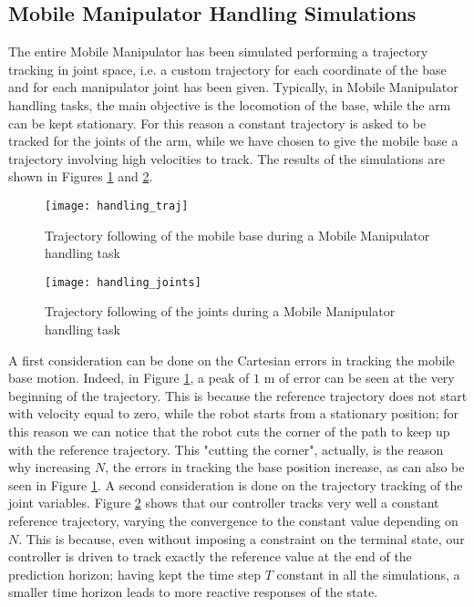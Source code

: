 \subsection{Mobile Manipulator Handling Simulations}
The entire Mobile Manipulator has been simulated performing a trajectory tracking in joint space, i.e. a custom trajectory for each coordinate of the base and for each manipulator joint has been given. Typically, in Mobile Manipulator handling tasks, the main objective is the locomotion of the base, while the arm can be kept stationary. For this reason a constant trajectory is asked to be tracked for the joints of the arm, while we have chosen to give the mobile base a trajectory involving high velocities to track. The results of the simulations are shown in Figures \ref{handling_traj} and \ref{handling_joints}. 
\begin{figure}[p]
	\centering
	\texttt{[image: handling\_traj]}
	\caption{Trajectory following of the mobile base during a Mobile Manipulator handling task}
	\label{handling_traj}
\end{figure}
\begin{figure}[p]
	\centering
	\texttt{[image: handling\_joints]}
	\caption{Trajectory following of the joints during a Mobile Manipulator handling task}
	\label{handling_joints}
\end{figure}A first consideration can be done on the Cartesian errors in tracking the mobile base motion. Indeed, in Figure \ref{handling_traj}, a peak of $1$ m of error can be seen at the very beginning of the trajectory. This is because the reference trajectory does not start with velocity equal to zero, while the robot starts from a stationary position; for this reason we can notice that the robot cuts the corner of the path to keep up with the reference trajectory. This "cutting the corner", actually, is the reason why increasing $N$, the errors in tracking the base position increase, as can also be seen in Figure \ref{handling_traj}. A second consideration is done on the trajectory tracking of the joint variables. Figure \ref{handling_joints} shows that our controller tracks very well a constant reference trajectory, varying the convergence to the constant value depending on $N$. This is because, even without imposing a constraint on the terminal state, our controller is driven to track exactly the reference value at the end of the prediction horizon; having kept the time step $T$ constant in all the simulations, a smaller time horizon leads to more reactive responses of the state.


